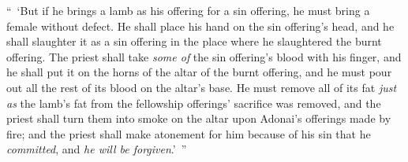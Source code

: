 \begin{biblechapter}
\verse “ ‘But if he brings a lamb as his offering for a sin offering, he must bring a female without defect.
\verse He shall place his hand on the sin offering’s head, and he shall slaughter it as a sin offering in the place where he slaughtered the burnt offering.
\verse The priest shall take \textit{some of} the sin offering’s blood with his finger, and he shall put it on the horns of the altar of the burnt offering, and he must pour out all the rest of its blood on the altar’s base.
\verse He must remove all of its fat \textit{just as} the lamb’s fat from the fellowship offerings’ sacrifice was removed, and the priest shall turn them into smoke on the altar upon Adonai’s offerings made by fire; and the priest shall make atonement for him because of his sin that he \textit{committed}, and \textit{he will be forgiven}.’ ”
\end{biblechapter}

